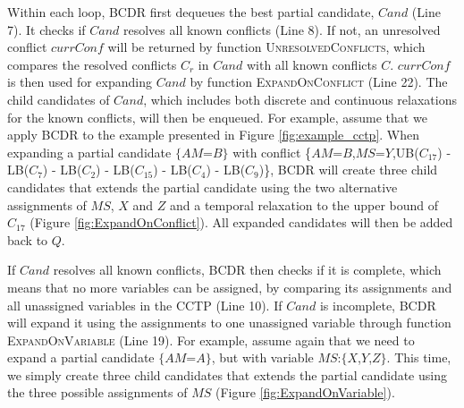 \documentclass[jair,twoside,11pt,theapa]{article}
\begin{document}
Within each loop, BCDR first dequeues the best partial candidate, $\mathit{Cand}$ (Line
7). It checks if $\mathit{Cand}$ resolves all known conflicts (Line 8). If not, an
unresolved conflict $\mathit{currConf}$ will be returned by function
\textsc{UnresolvedConflicts}, which compares the resolved conflicts $C_r$ in
$\mathit{Cand}$ with all known conflicts $C$. $\mathit{currConf}$ is then used for expanding $\mathit{Cand}$
by function \textsc{ExpandOnConflict} (Line 22). The child candidates of $\mathit{Cand}$,
which includes both discrete and continuous relaxations for the known conflicts,
will then be enqueued. For example, assume that we apply BCDR to the example
presented in Figure \ref{fig:example_cctp}. When expanding
a partial candidate $\{AM$=$B\}$ with conflict
\{$AM$=$B$,$MS$=$Y$,\textsc{UB}($C_{17}$) - \textsc{LB}($C_{7}$) -
\textsc{LB}($C_{2}$) - \textsc{LB}($C_{15}$) - \textsc{LB}($C_{4}$) -
\textsc{LB}($C_{9}$)\}, BCDR will create three child candidates that extends
the partial candidate using the two alternative assignments of $MS$, $X$ and $Z$
and a temporal relaxation to the upper bound of $C_{17}$ (Figure
\ref{fig:ExpandOnConflict}). All expanded candidates
will then be added back to $Q$.


If $\mathit{Cand}$ resolves all known conflicts, BCDR then checks if it is complete,
which means that no more variables can be assigned, by comparing its assignments
and all unassigned variables in the CCTP (Line 10). If $\mathit{Cand}$ is incomplete, BCDR
will expand it using the assignments to one unassigned variable through function
\textsc{ExpandOnVariable} (Line 19). For example, assume again that we need to expand
a partial candidate $\{AM$=$A\}$, but with variable
$MS$:$\{X$,$Y$,$Z\}$. This time, we simply create three child candidates that extends
the partial candidate using the three possible assignments of $MS$ (Figure
\ref{fig:ExpandOnVariable}).
\end{document}
